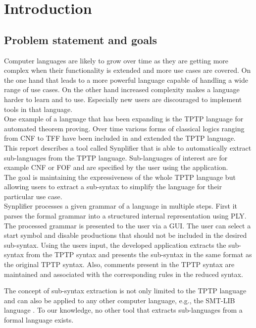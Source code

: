 
\chapter{Introduction}\label{cha:Introduction}

\section{Problem statement and goals}\label{sec:Aufgabenstellung}

Computer languages are likely to grow over time as they are getting more complex when their functionality is extended and more use cases are covered.
On the one hand that leads to a more powerful language capable of handling a wide range of use cases.
On the other hand increased complexity makes a language harder to learn and to use. Especially new users are discouraged to implement tools in that language.\\
One example of a language that has been expanding is the \ac{TPTP} language for automated theorem proving. Over time
various forms of classical logics ranging from \ac{CNF} to \ac{TFF} have been included in and extended the \ac{TPTP} language. \\
This report describes a tool called \ac{Synplifier} that is able to automatically extract sub-languages from the \ac{TPTP} language. Sub-languages of interest are for example \ac{CNF} or \ac{FOF} and are specified by the user using the application.\\
The goal is maintaining the expressiveness of the whole \ac{TPTP} language but allowing users to extract a sub-syntax to simplify the language for their particular use case. \\
\ac{Synplifier} processes a given grammar of a language in multiple steps.
First it parses the formal grammar into a structured internal representation using \ac{PLY}.
The processed grammar is presented to the user via a GUI. The user can select a start symbol and disable productions that should not be included in the desired sub-syntax.
Using the users input, the developed application extracts the sub-syntax from the \ac{TPTP} syntax and presents the sub-syntax in the same format as the original \ac{TPTP} syntax.
Also, comments present in the \ac{TPTP} syntax are maintained and associated with the corresponding rules in the reduced syntax.

The concept of sub-syntax extraction is not only limited to the \ac{TPTP} language and can also
be applied to any other computer language, e.g., the SMT-LIB language \cite{BFT-SMTLIB-17}. To our knowledge, no other tool that extracts sub-languages from a formal language exists.

